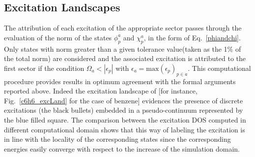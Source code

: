 \documentclass[reprint,aps,prb]{revtex4-1}
\begin{document}
\subsection{Excitation Landscapes}
The attribution of each excitation of the appropriate sector passes through the evaluation of the norm of the states $\phi_p^a$ and $\chi_p^a$, in the form of Eq.~\eqref{phiandchi}. Only states with norm greater than a given tolerance value(taken as the 1\% of the total norm) are considered and the associated
excitation is attributed to the first sector if the condition $\Omega_a < |\epsilon_p|$ with $\epsilon_a = \mathrm{max}\left(\epsilon_p\right)_{p\in a}$.
This computational procedure provides results in optimum agreement with the formal arguments reported above. Indeed the excitation landscape of
[for instance, Fig.~\eqref{c6h6_excLand} for the case of benzene] evidences the presence of discrete excitations (the black bullets) embedded in a pseudo-continuum
represented by the blue filled square. The comparison between the excitation DOS computed in different computational domain shows that this way of labeling the excitation is in line with the locality of the corresponding states since the corresponding energies easily converge with respect to the increase of the simulation domain.



%

\end{document}
